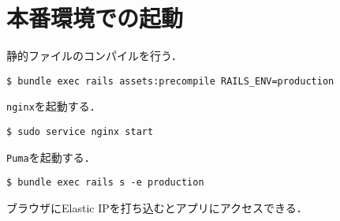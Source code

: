 \section{本番環境での起動}
静的ファイルのコンパイルを行う．
\begin{screen}
    \texttt{\$ bundle exec rails assets:precompile RAILS\_ENV=production}
\end{screen}
\texttt{nginx}を起動する．
\begin{screen}
    \texttt{\$ sudo service nginx start}
\end{screen}
\texttt{Puma}を起動する．
\begin{screen}
    \texttt{\$ bundle exec rails s -e production}
\end{screen}
ブラウザにElastic IPを打ち込むとアプリにアクセスできる．